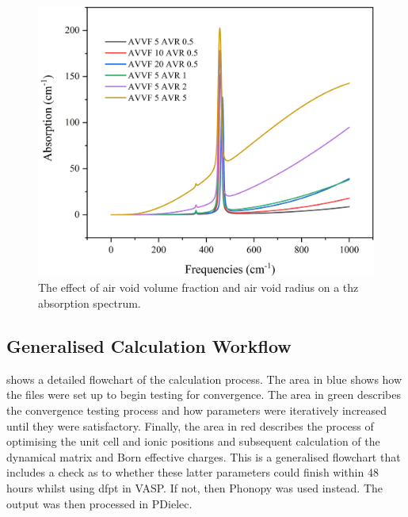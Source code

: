 \begin{figure}
    \centering
    \includegraphics[scale=0.6]{Figures/Misc/Theory/EffectOfAirG.png}
    \captionsetup{font = footnotesize, justification = centering}
    \caption[The Effect of Air void Volume Fraction and Air Void Radius on a Calculated THz Absorption Spectrum]{The effect of air void volume fraction and air void radius on a \acrshort{thz} absorption spectrum.}
    \label{fig:AirEffect}
\end{figure}

\subsection{Generalised Calculation Workflow}
 shows a detailed flowchart of the calculation process. The area in blue shows how the files were set up to begin testing for convergence. The area in green describes the convergence testing process and how parameters were iteratively increased until they were satisfactory. Finally, the area in red describes the process of optimising the unit cell and ionic positions and subsequent calculation of the dynamical matrix and Born effective charges. This is a generalised flowchart that includes a check as to whether these latter parameters could finish within 48 hours whilst using \acrshort{dfpt} in VASP. If not, then Phonopy was used instead. The output was then processed in PDielec.


